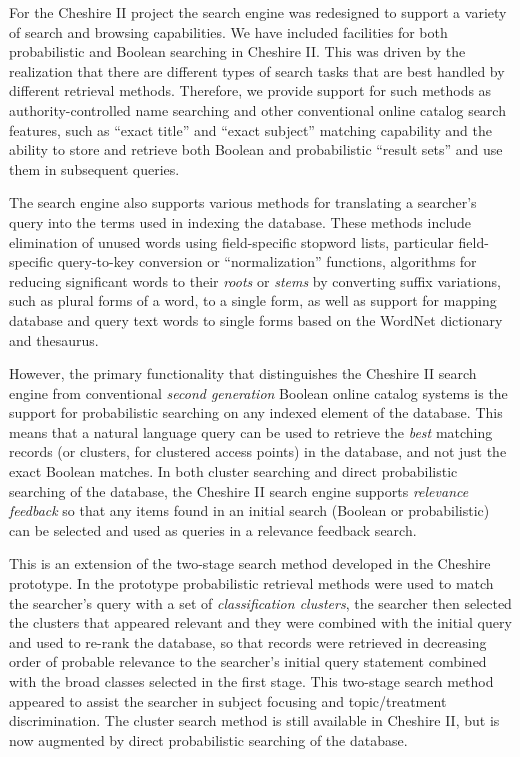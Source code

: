 For the Cheshire II project the search engine was redesigned to
support a variety of search and browsing capabilities. We have
included facilities for both probabilistic and Boolean searching in
Cheshire II. This was driven by the realization that there are
different types of search tasks that are best handled by different
retrieval methods.  Therefore, we provide support for such methods as
authority-controlled name searching and other conventional online
catalog search features, such as ``exact title'' and ``exact subject''
matching capability and the ability to store and retrieve both Boolean
and probabilistic ``result sets'' and use them in subsequent queries.

The search engine also supports various methods for translating a
searcher's query into the terms used in indexing the database. These
methods include elimination of unused words using field-specific
stopword lists, particular field-specific query-to-key conversion or
``normalization'' functions, algorithms for reducing significant words
to their {\em roots} or {\em stems} by converting suffix variations,
such as plural forms of a word, to a single form, as well as support
for mapping database and query text words to single forms based on the
WordNet dictionary and thesaurus.

However, the primary functionality that distinguishes the Cheshire II
search engine from conventional {\em second generation} Boolean online
catalog systems is the support for probabilistic searching on any
indexed element of the database. This means that a natural language
query can be used to retrieve the {\em best} matching records (or
clusters, for clustered access points) in the database, and not just
the exact Boolean matches. In both cluster searching and direct
probabilistic searching of the database, the Cheshire II search engine
supports {\em relevance feedback} so that any items found in an
initial search (Boolean or probabilistic) can be selected and used as
queries in a relevance feedback search. 

This is an extension of the two-stage search method developed in the
Cheshire prototype. In the prototype probabilistic retrieval methods
were used to match the searcher's query with a set of {\em
classification clusters}, the searcher then selected the clusters that
appeared relevant and they were combined with the initial query and
used to re-rank the database, so that records were retrieved in
decreasing order of probable relevance to the searcher's initial query
statement combined with the broad classes selected in the first stage.
This two-stage search method appeared to assist the searcher in
subject focusing and topic/treatment discrimination\cite{CLASSCLUS}. The
cluster search method is still available in Cheshire II, but is now augmented
by direct probabilistic searching of the database.

